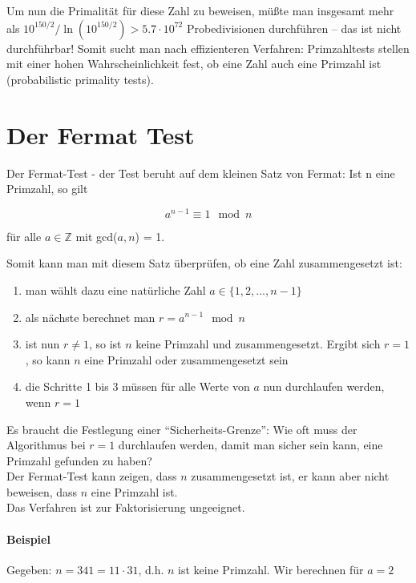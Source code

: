 Um nun die Primalität für diese Zahl zu beweisen, müßte man insgesamt mehr als
$10^{150/2} / \ln(10^{150/2}) > 5.7 \cdot 10^{72}$ Probedivisionen durchführen -- das ist nicht durchführbar!
Somit sucht man nach effizienteren Verfahren: Primzahltests stellen mit einer
hohen Wahrscheinlichkeit fest, ob eine Zahl auch eine Primzahl ist (probabilistic primality
tests).

\section{Der Fermat Test}
Der Fermat-Test
- der Test beruht auf dem kleinen Satz von Fermat: Ist n eine Primzahl, so gilt 

$$a^{n-1} \equiv 1  \mod n$$ 

für alle $a \in \mathbb{Z}$ mit gcd($a,n$) = 1.

Somit kann man mit diesem Satz überprüfen, ob eine Zahl zusammengesetzt ist:

\begin{enumerate}
    \item man wählt dazu eine natürliche Zahl $a \in \{1,2, \ldots, n-1\}$
    \item als nächste berechnet man $r = a^{n-1} \mod n$
    \item ist nun $r \neq 1$, so ist $n$ keine Primzahl und zusammengesetzt. Ergibt sich $r = 1$, so kann $n$ eine Primzahl oder zusammengesetzt sein
    \item die Schritte 1 bis 3 müssen für alle Werte von $a$ nun durchlaufen werden, wenn $r = 1$
\end{enumerate}

Es braucht die Festlegung einer ``Sicherheits-Grenze'': Wie oft muss der Algorithmus bei $r = 1$ durchlaufen werden, damit man sicher sein kann, eine Primzahl gefunden 
zu haben?\\
    
\noindent Der Fermat-Test kann zeigen, dass $n$ zusammengesetzt ist, er kann aber nicht beweisen, dass $n$ eine Primzahl ist. \\

\noindent Das Verfahren ist zur Faktorisierung ungeeignet.

\paragraph{Beispiel}
Gegeben: $n = 341 = 11 \cdot 31$,  d.h. $n$ ist keine Primzahl. Wir berechnen für $a = 2$

